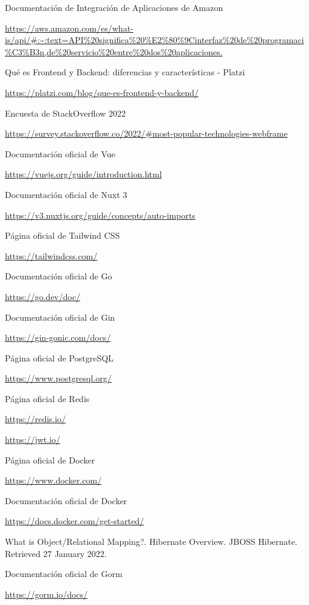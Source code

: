\printbibliography[heading=bibintoc]
\begin{thebibliography}{X}
	 Documentación de Integración de Aplicaciones de Amazon
	
	
	\url{https://aws.amazon.com/es/what-is/api/#:~:text=API%20significa%20%E2%80%9Cinterfaz%20de%20programaci%C3%B3n,de%20servicio%20entre%20dos%20aplicaciones.}


	 Qué es Frontend y Backend: diferencias y características - Platzi
	
	\url{https://platzi.com/blog/que-es-frontend-y-backend/}
	
	 Encuesta de StackOverflow 2022
	
	
	\url{https://survey.stackoverflow.co/2022/#most-popular-technologies-webframe}
	
 Documentación oficial de Vue

\url{https://vuejs.org/guide/introduction.html}

 Documentación oficial de Nuxt 3

\url{https://v3.nuxtjs.org/guide/concepts/auto-imports}

 Página oficial de Tailwind CSS

\url{https://tailwindcss.com/}

 Documentación oficial de Go

\url{https://go.dev/doc/}

 Documentación oficial de Gin

\url{https://gin-gonic.com/docs/}

 Página oficial de PostgreSQL

\url{https://www.postgresql.org/}

 Página oficial de Redis

\url{https://redis.io/}

 \url{https://jwt.io/}

 Página oficial de Docker

\url{https://www.docker.com/}

 Documentación oficial de Docker

\url{https://docs.docker.com/get-started/}

 What is Object/Relational Mapping?. Hibernate Overview. JBOSS Hibernate. Retrieved 27 January 2022.

 Documentación oficial de Gorm

\url{https://gorm.io/docs/}
	
\end{thebibliography}